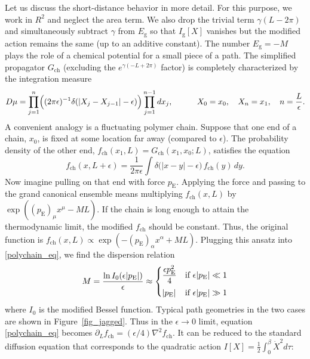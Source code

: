 \documentclass[12pt]{article}
\newcommand{\RR}{\mathbb{R}}
\newcommand{\ch}{\text{ch}}
\newcommand{\g}{\text{g}}
\newcommand{\Euc}{\mathrm{E}}
\def\RR{R}
\begin{document}
Let us discuss the short-distance behavior in more detail. For this purpose, we work in $\RR^2$ and neglect the area term. We also drop the trivial term $\gamma(L-2\pi)$ and simultaneously subtract $\gamma$ from $E_{\g}$ so that $I_{\g}[X]$ vanishes but the modified action remains the same (up to an additive constant). The number $E_{\g}=-M$ plays the role of a chemical potential for a small piece of a path. The simplified propagator $G_{\ch}$ (excluding the $e^{\gamma(-L+2\pi)}$ factor) is completely characterized by the integration measure
\begin{equation}
D\mu=\prod_{j=1}^{n}
\Bigl((2\pi\epsilon)^{-1}\delta(|X_{j}-X_{j-1}|-\epsilon)\Bigr)
\prod_{j=1}^{n-1}dx_j,\qquad\quad
X_0=x_0,\quad X_n=x_1,\quad n=\frac{L}{\epsilon}.
\end{equation}
A convenient analogy is a fluctuating polymer chain. Suppose that one end of a chain, $x_0$, is fixed at some location far away (compared to $\epsilon$). The probability density of the other end, $f_{\ch}(x_1,L)=G_{\ch}(x_1,x_0;L)$, satisfies the equation
\begin{equation}\label{polychain_eq}
f_{\ch}(x,L+\epsilon)=\frac{1}{2\pi\epsilon}
\int\delta\bigl(|x-y|-\epsilon\bigr)\,f_{\ch}(y)\,dy.
\end{equation}
Now imagine pulling on that end with force $p_{\Euc}$. Applying the force and passing to the grand canonical ensemble means multiplying $f_{\ch}(x,L)$ by $\exp((p_{\Euc})_{\mu}x^{\mu}-ML)$. If the chain is long enough to attain the thermodynamic limit, the modified $f_{\ch}$ should be constant. Thus, the original function is $f_{\ch}(x,L)\propto\exp(-(p_{\Euc})_{\alpha}x^{\alpha}+ML)$. Plugging this ansatz into \eqref{polychain_eq}, we find the dispersion relation
\begin{equation}\label{Euc_disp}
M=\frac{\ln I_{0}(\epsilon|p_{\Euc}|)}{\epsilon}
\approx\begin{dcases}
\frac{\epsilon p_{\Euc}^2}{4} & \text{if } \epsilon|p_{\Euc}|\ll 1\\[2pt]
|p_{\Euc}|& \text{if } \epsilon|p_{\Euc}|\gg 1
\end{dcases}
\end{equation}
where $I_0$ is the modified Bessel function. Typical path geometries in the two cases are shown in Figure~\ref{fig_jagged}. Thus in the $\epsilon\to 0$ limit, equation \eqref{polychain_eq} becomes $\partial_{L}f_{\ch}=(\epsilon/4)\nabla^2f_{\ch}$. It can be reduced to the standard diffusion equation that corresponds to the quadratic action $I[X] =\frac{1}{2}\int_{0}^{\beta}\dot{X}^2d\tau$:
\end{document}
